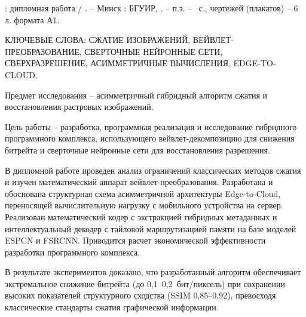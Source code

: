 
\MakeUppercase{\taskNameFull} : дипломная работа / \studentShort. -- Минск : БГУИР, \targetYear. -- п.з. -- ~с., чертежей (плакатов) -- 6 л. формата А1.

\vspace{1em}

КЛЮЧЕВЫЕ СЛОВА: СЖАТИЕ ИЗОБРАЖЕНИЙ, ВЕЙВЛЕТ-ПРЕОБРАЗОВАНИЕ, СВЕРТОЧНЫЕ НЕЙРОННЫЕ СЕТИ, СВЕРХРАЗРЕШЕНИЕ, АСИММЕТРИЧНЫЕ ВЫЧИСЛЕНИЯ, EDGE-TO-CLOUD.

\vspace{1em}

Предмет исследования -- асимметричный гибридный алгоритм сжатия и восстановления растровых изображений.

Цель работы -- разработка, программная реализация и исследование гибридного программного комплекса, использующего вейвлет-декомпозицию для снижения битрейта и сверточные нейронные сети для восстановления разрешения.

В дипломной работе проведен анализ ограничений классических методов сжатия и изучен математический аппарат вейвлет-преобразования. Разработана и обоснована структурная схема асимметричной архитектуры Edge-to-Cloud, переносящей вычислительную нагрузку с мобильного устройства на сервер. Реализован математический кодер с экстракцией гибридных метаданных и интеллектуальный декодер с тайловой маршрутизацией памяти на базе моделей ESPCN и FSRCNN. Приводится расчет экономической эффективности разработки программного комплекса.

В результате экспериментов доказано, что разработанный алгоритм обеспечивает экстремальное снижение битрейта (до 0,1--0,2~бит/пиксель) при сохранении высоких показателей структурного сходства (SSIM 0,85--0,92), превосходя классические стандарты сжатия графической информации.